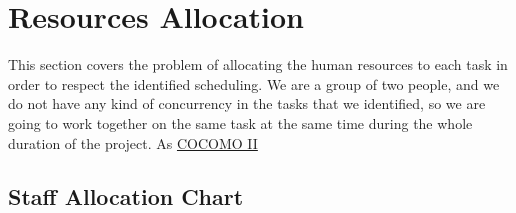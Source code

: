\section{Resources Allocation}
This section covers the problem of allocating the human resources to each task in order to respect the identified scheduling.
We are a group of two people, and we do not have any kind of concurrency in the tasks that we identified, so we are going to work together on the same task at the same time during the whole duration of the project.
As \href{fig:1}{COCOMO II}
%
\subsection{Staff Allocation Chart}

\begin{center}
	\begin{ganttchart}[hgrid=true, x unit=2.2mm, link bulge=0.75]{1}{42}
		  \\
		  \\
		  
	\end{ganttchart}
\end{center}
%